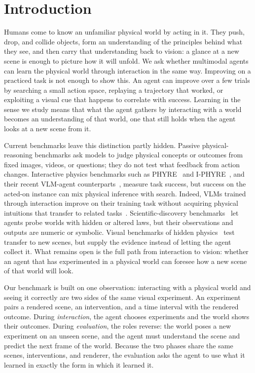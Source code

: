 \section{Introduction}
\label{sec:intro}

Humans come to know an unfamiliar physical world by acting in it. They push, drop, and collide objects, form an understanding of the principles behind what they see, and then carry that understanding back to vision: a glance at a new scene is enough to picture how it will unfold. We ask whether multimodal agents can learn the physical world through interaction in the same way. Improving on a practiced task is not enough to show this. An agent can improve over a few trials by searching a small action space, replaying a trajectory that worked, or exploiting a visual cue that happens to correlate with success. Learning in the sense we study means that what the agent gathers by interacting with a world becomes an understanding of that world, one that still holds when the agent looks at a new scene from it.

Current benchmarks leave this distinction partly hidden. Passive physical-reasoning benchmarks ask models to judge physical concepts or outcomes from fixed images, videos, or questions; they do not test what feedback from action changes. Interactive physics benchmarks such as PHYRE~\cite{phyre} and I-PHYRE~\cite{iphyre}, and their recent VLM-agent counterparts~\cite{deepphy,ipr1}, measure task success, but success on the acted-on instance can mix physical inference with search. Indeed, VLMs trained through interaction improve on their training task without acquiring physical intuitions that transfer to related tasks~\cite{schulzebuschoff2026}. Scientific-discovery benchmarks~\cite{physgym,newtonbench,discoverphysics} let agents probe worlds with hidden or altered laws, but their observations and outputs are numeric or symbolic. Visual benchmarks of hidden physics~\cite{comphy,inphyre} test transfer to new scenes, but supply the evidence instead of letting the agent collect it. What remains open is the full path from interaction to vision: whether an agent that has experimented in a physical world can foresee how a new scene of that world will look.

Our benchmark is built on one observation: interacting with a physical world and seeing it correctly are two sides of the same visual experiment. An experiment pairs a rendered scene, an intervention, and a time interval with the rendered outcome. During \emph{interaction}, the agent chooses experiments and the world shows their outcomes. During \emph{evaluation}, the roles reverse: the world poses a new experiment on an unseen scene, and the agent must understand the scene and predict the next frame of the world. Because the two phases share the same scenes, interventions, and renderer, the evaluation asks the agent to use what it learned in exactly the form in which it learned it.

